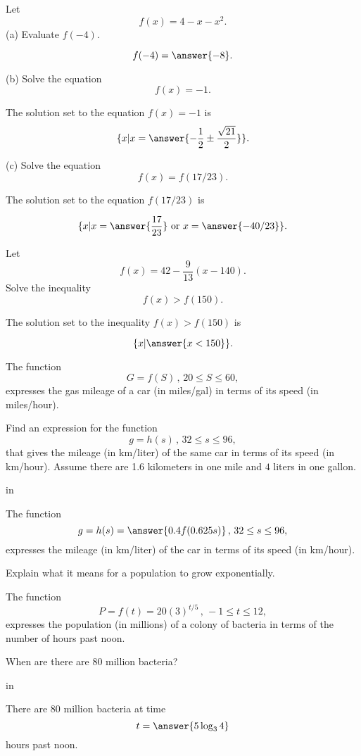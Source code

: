\documentclass{ximera}
\newcommand{\pskip}{\vskip 0.1 in}
\begin{document}
\begin{question} \label{Qpdf0gbvgbrtg}
Let
\[
      f(x) = 4 - x - x^2 .
\]
(a) Evaluate $f(-4)$.

\[
    f(-4) = \answer{-8} .
\]

(b) Solve the equation 
\[
      f(x) = -1 .
\]

The solution set to the equation $f(x)=-1$ is
\[
  \{  x | x = \answer{-\frac{1}{2} \pm \frac{\sqrt{21}}{2}}  \}.
\]

(c) Solve the equation
\[
       f(x) = f(17/23) .
\]

The solution set to the equation $f(17/23)$ is

\[
   \{  x | x = \answer{\frac{17}{23}} \text{ or } x=\answer{-40/23}  \}.
\]

\end{question}


\begin{question}  \label{Qdfdcg4tythyh5t}
Let 
\[
       f(x) = 42 - \frac{9}{13}(x - 140) .
\]
Solve the inequality
\[
     f(x) > f(150) .
\]

The solution set to the inequality $f(x)>f(150)$ is

\[
    \{  x | \answer{x < 150}  \}.
\]

\end{question}


\begin{question}  \label{Qdfb44t4w4333}
The function 
\[
  G = f(S) \, , \, 20\leq S \leq 60 ,
\]
expresses the gas mileage of a car (in miles/gal) in terms of its speed (in miles/hour).
 
Find an expression for the function 
\[
   g = h(s) \, , \, 32\leq s \leq 96 ,
\]
that gives the mileage (in km/liter) of the same car in terms of its speed (in km/hour). Assume there are 1.6 kilometers in one mile and $4$ liters in one gallon.

\pskip

The function 
\[
    g = h(s) =   \answer{0.4f(0.625s) } \, , \, 32\leq s \leq 96 ,
\]
expresses the mileage (in km/liter) of the car in terms of its speed (in km/hour). 

\end{question}


\begin{question}  \label{Eer5htrree}
Explain what it means for a population to grow exponentially.
\end{question}

\begin{question}
The function
\[
  P = f(t) = 20 (3)^{t/5} \, , \, -1 \leq t \leq 12 ,
\]
expresses the population (in millions) of a colony of bacteria in terms of the number of hours past noon. 

When are there are 80 million bacteria?

\pskip

There are 80 million bacteria at time
\[
 t = \answer{5 \log_3 4}
\]
hours past noon.
\end{question}
\end{document}
